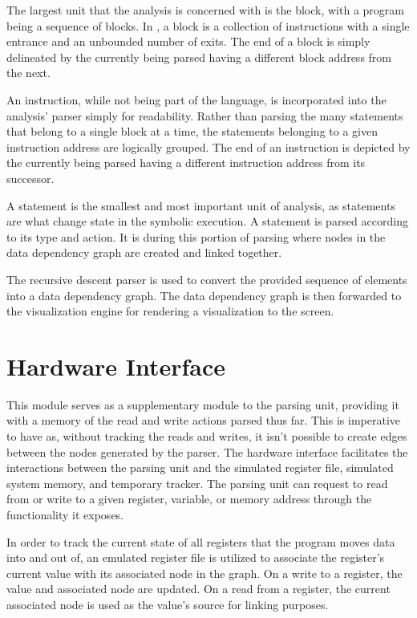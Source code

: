 The largest unit that the analysis is concerned with is the block, with a program being a sequence of blocks. In , a block is a collection of instructions with a single entrance and an unbounded number of exits. The end of a block is simply delineated by the  currently being parsed having a different block address from the next.

An instruction, while not being part of the  language, is incorporated into the analysis’ parser simply for readability. Rather than parsing the many statements that belong to a single block at a time, the statements belonging to a given instruction address are logically grouped. The end of an instruction is depicted by the  currently being parsed having a different instruction address from its successor. 

A statement is the smallest and most important unit of analysis, as  statements are what change state in the symbolic execution. A statement is parsed according to its type and action. It is during this portion of parsing where nodes in the data dependency graph are created and linked together.

The recursive descent parser is used to convert the provided sequence of  elements into a data dependency graph. The data dependency graph is then forwarded to the visualization engine for rendering a visualization to the screen.

\section{Hardware Interface}
This module serves as a supplementary module to the parsing unit, providing it with a memory of the read and write actions parsed thus far. This is imperative to have as, without tracking the reads and writes, it isn't possible to create edges between the nodes generated by the parser. The hardware interface facilitates the interactions between the parsing unit and the simulated register file, simulated system memory, and temporary tracker. The parsing unit can request to read from or write to a given register, variable, or memory address through the functionality it exposes.

In order to track the current state of all registers that the program moves data into and out of, an emulated register file is utilized to associate the register’s current value with its associated node in the graph. On a write to a register, the value and associated node are updated. On a read from a register, the current associated node is used as the value’s source for linking purposes. 

